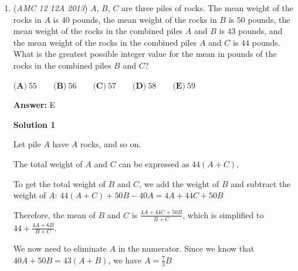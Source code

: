 \begin{enumerate}
 \textbf{Together:}Both parents are in one store and the 3 children are split between the other two. There are $\binom{3}{2}$ ways to split the children and $3!$ ways to choose to which store each group will be sold. $3! \cdot \binom{3}{2} = 18$.

 $(6 + 18) \cdot 4 = 96$ total arrangements.

 
3) All $4$ stores are involved. We break down the problem as previously shown.

 
\textbf{Separately:}All children must be split between two stores. There are $\binom{3}{2} = 3$ ways to arrange this. We can then arrange which group is sold to which store in $4!$ ways. $4! \cdot 3 = 72$.

 \textbf{Together:}Both parents are in one store and the 3 children are each in another store. There are $4! = 24$ ways to arrange this.

 $24 + 72 = 96$ total arrangements.

 
\textbf{Final Answer:}$12 + 96 + 96 = \boxed{\textbf{(D)} \: 204}$.

 


	\item (\textit{AMC 12 12A 2013}) $A$, $B$, $C$ are three piles of rocks. The mean weight of the rocks in $A$ is $40$ pounds, the mean weight of the rocks in $B$ is $50$ pounds, the mean weight of the rocks in the combined piles $A$ and $B$ is $43$ pounds, and the mean weight of the rocks in the combined piles $A$ and $C$ is $44$ pounds. What is the greatest possible integer value for the mean in pounds of the rocks in the combined piles $B$ and $C$?


 $\textbf{(A)} \ 55 \qquad \textbf{(B)} \ 56 \qquad \textbf{(C)} \ 57 \qquad \textbf{(D)} \ 58 \qquad \textbf{(E)} \ 59$

 \textbf{Answer: }E



\textbf{Solution 1}

Let pile $A$ have $A$ rocks, and so on.

 The total weight of $A$ and $C$ can be expressed as $44(A + C)$.

 To get the total weight of $B$ and $C$, we add the weight of $B$ and subtract the weight of $A$: $44(A + C) + 50B - 40A = 4A + 44C + 50B$

 Therefore, the mean of $B$ and $C$ is $\frac{4A + 44C + 50B}{B + C}$, which is simplified to $44 + \frac{4A + 6B}{B + C}$.

 We now need to eliminate $A$ in the numerator.  Since we know that $40A + 50B = 43(A + B)$, we have $A = \frac{7}{3}B$


\end{enumerate}
